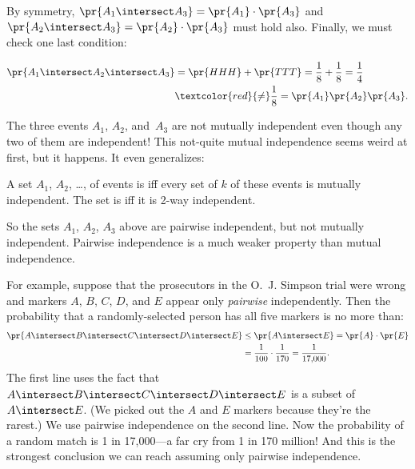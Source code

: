 By symmetry, $\pr{A_1 \intersect A_3} = \pr{A_1} \cdot \pr{A_3}$ and
$\pr{A_2 \intersect A_3} = \pr{A_2} \cdot \pr{A_3}$ must hold also.
Finally, we must check one last condition:

\begin{align*}
\pr{A_1 \intersect A_2 \intersect A_3}
        & = \pr{HHH} + \pr{TTT}
          = \frac{1}{8} + \frac{1}{8}
          = \frac{1}{4}\\
        & \textcolor{red}{\mathbf{\neq}} \frac{1}{8} = \pr{A_1} \pr{A_2} \pr{A_3}.
\end{align*}


\iffalse
\begin{align*}
\pr{A_1 \intersect A_2 \intersect A_3}      & = \pr{HHH} + \pr{TTT} \\[2pt]
                                & = \frac{1}{8} + \frac{1}{8} \\[2pt]
                                & = \frac{1}{4} \\[2pt]
                                & \neq \pr{A_1} \pr{A_2} \pr{A_3} = \frac{1}{8}.
\end{align*}
\fi
%
The three events $A_1$, $A_2$, and~$A_3$ are not mutually independent
even though any two of them are independent!  This not-quite mutual
independence seems weird at first, but it happens.  It even
generalizes:

\begin{definition}\label{kway_independent_events}
  A set $A_1$, $A_2$, \dots, of events is 
  iff every set of $k$ of these events is mutually independent.  The
  set is  iff it is 2-way independent.
\end{definition}

So the sets $A_1$, $A_2$, $A_3$ above are pairwise independent, but
not mutually independent.  Pairwise independence is a much weaker
property than mutual independence.

For example, suppose that the prosecutors in the O.~J. Simpson trial
were wrong and markers $A$, $B$, $C$, $D$, and $E$ appear only
\emph{pairwise} independently.  Then the probability that a
randomly-selected person has all five markers is no more than:
%
\begin{align*}
\pr{A \intersect B \intersect C \intersect D \intersect E}
    & \leq \pr{A \intersect E} = \pr{A} \cdot \pr{E}\\
    & = \frac{1}{100} \cdot \frac{1}{170} = \frac{1}{17{,}000}.
\end{align*}
%
The first line uses the fact that $A \intersect B \intersect C \intersect
D \intersect E$ is a subset of $A \intersect E$.  (We picked out the $A$
and $E$ markers because they're the rarest.)  We use pairwise independence
on the second line.  Now the probability of a random match is 1 in
17,000---a far cry from 1 in 170 million!  And this is the strongest
conclusion we can reach assuming only pairwise independence.

